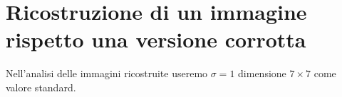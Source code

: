 \section{Ricostruzione di un immagine rispetto una versione corrotta}
Nell'analisi delle immagini ricostruite useremo $\sigma=1$ dimensione $7\times 7$ come valore standard.


